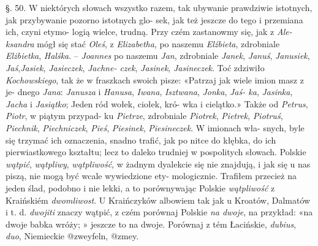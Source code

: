 §. 50.
W niektórych słowach wszystko razem, tak ubywanie
prawdziwie istotnych, jak przybywanie pozorno istotnych glo-
sek, jak też jeszcze do tego i przemiana ich, czyni etymo-
logią wielce, trudną. Przy czém zastanowmy się, jak z \textit{Ale-
ksandra} mógł się stać \textit{Oleś}, z \textit{Elizabetha}, po naszemu \textit{Elźbieta},
zdrobniale \textit{Elżbietka}, \textit{Halśka}. -- \textit{Joannes} po naszemu \textit{Jan},
zdrobniale \textit{Janek}, \textit{Januś},\textit{ Janusiek}, \textit{Jaś},\textit{Jasiek},\textit{ Jasieczek}, \textit{Jachne-
czek}, \textit{Jasinek}, \textit{Jasineczek}. Toć zdziwiło \textit{Kochowskiego}, tak że w
fraszkach swoich pisze: «Patrzaj jak wiele imion masz z je-
dnego \textit{Jana}: \textit{Janusza} i \textit{Hanusa}, \textit{Iwana}, \textit{Isztwana}, \textit{Jonka}, \textit{Jaś-
ka}, \textit{Jasinka}, \textit{Jacha} i \textit{Jasiątko}; Jeden ród wołek, ciołek, kró-
wka i cielątko.» Także od \textit{Petrus}, \textit{Piotr}, w piątym przypad-
ku \textit{Pietrze}, zdrobniale \textit{Piotrek}, \textit{Pietrek}, \textit{Piotruś}, \textit{Piechnik},
\textit{Piechniczek}, \textit{Pieś},\textit{ Piesinek}, \textit{Piesineczek}. W imionach wła-
snych, byle się trzymać ich oznaczenia, snadno trafić, jak
po nitce do kłębka, do ich pierwiastkowego kształtu; lecz
to daleko trudniej w pospolitych słowach. Polskie\textit{ wątpić},
\textit{wątpliwy}, \textit{wątpliwość}, w żadnym dyalekcie się nie znajdują,
i jak się u nas piszą, nie mogą być wcale wywiedzione ety-
mologicznie. Trafiłem przecież na jeden ślad, podobno i nie
lekki, a to porównywając Polskie \textit{wątpliwość} z Kraińskiém
\textit{dwomliwost}. U Kraińczyków albowiem tak jak u Kroatów,
Dalmatów i t. d. \textit{dwojiti} znaczy wątpić, z czém porównaj
Polskie \textit{na dwoje}, na przykład: «na dwoje babka wróży; »
jeszcze to na dwoje. Porównaj z tém Łacińskie, \textit{dubius}, \textit{duo},
Niemieckie @{zweyfeln}, @{zmey}.


